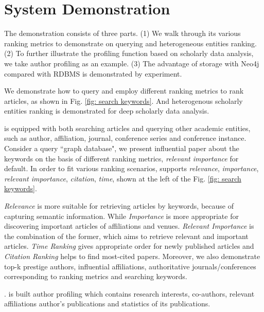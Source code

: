 \section{System Demonstration}
\label{sec-demo}

The demonstration consists of three parts. (1) We walk through its various ranking metrics to demonstrate \oursystem on querying and heterogeneous entities ranking. (2) To further illustrate the profiling function based on scholarly data analysis, we take author profiling as an example. (3) The advantage of storage with Neo4j compared with RDBMS is demonstrated by experiment.

 We demonstrate how to query and employ different ranking metrics to rank articles, as shown in Fig. \ref{fig: search keywords}. And heterogenous scholarly entities ranking is demonstrated for deep scholarly data analysis.

\par
\oursystem is equipped with both searching articles and querying other academic entities, such as author, affiliation, journal, conference series and conference instance. Consider a query ``graph database", we present influential paper about the keywords on the basis of different ranking metrics, {\em relevant importance} for default. In order to fit various ranking scenarios, \oursystem supports {\em relevance}, {\em importance}, {\em relevant importance}, {\em citation}, {\em time}, shown at the left of the Fig. \ref{fig: search keywords}.

\par
{\em Relevance} is more suitable for retrieving articles by keywords, because of capturing semantic information. While {\em Importance} is more appropriate for discovering important articles of affiliations and venues. {\em Relevant Importance} is the combination of the former, which aims to retrieve relevant and important articles. {\em Time Ranking} gives appropriate order for newly published articles and {\em Citation Ranking} helps to find most-cited papers. Moreover, we also demonstrate top-k prestige authors, influential affiliations, authoritative journals/conferences corresponding to ranking metrics and searching keywords.


. \oursystem is built author profiling which contains research interests, co-authors, relevant affiliations author's publications and statistics of its publications.

